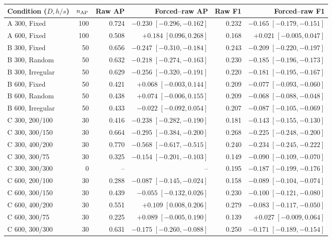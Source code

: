 \begin{tabular}{lrrrrr}
\toprule
Condition ($D,h/s$) & $n_{\rm AP}$ & Raw AP & Forced--raw AP & Raw F1 & Forced--raw F1 \\
\midrule
A 300, Fixed & 100 & 0.724 & $-0.230\;[-0.296,-0.162]$ & 0.232 & $-0.165\;[-0.179,-0.151]$ \\
A 600, Fixed & 100 & 0.508 & $+0.184\;[0.096,0.268]$ & 0.168 & $+0.021\;[-0.005,0.047]$ \\
B 300, Fixed & 50 & 0.656 & $-0.247\;[-0.310,-0.184]$ & 0.243 & $-0.209\;[-0.220,-0.197]$ \\
B 300, Random & 50 & 0.632 & $-0.218\;[-0.274,-0.163]$ & 0.230 & $-0.185\;[-0.196,-0.173]$ \\
B 300, Irregular & 50 & 0.629 & $-0.256\;[-0.320,-0.191]$ & 0.220 & $-0.181\;[-0.195,-0.167]$ \\
B 600, Fixed & 50 & 0.421 & $+0.068\;[-0.003,0.144]$ & 0.209 & $-0.077\;[-0.093,-0.060]$ \\
B 600, Random & 50 & 0.438 & $+0.074\;[-0.006,0.155]$ & 0.209 & $-0.068\;[-0.088,-0.048]$ \\
B 600, Irregular & 50 & 0.433 & $-0.022\;[-0.092,0.054]$ & 0.207 & $-0.087\;[-0.105,-0.069]$ \\
C 300, 200/100 & 30 & 0.416 & $-0.238\;[-0.282,-0.190]$ & 0.181 & $-0.143\;[-0.155,-0.130]$ \\
C 300, 300/150 & 30 & 0.664 & $-0.295\;[-0.384,-0.200]$ & 0.268 & $-0.225\;[-0.248,-0.200]$ \\
C 300, 400/200 & 30 & 0.770 & $-0.568\;[-0.617,-0.515]$ & 0.240 & $-0.234\;[-0.245,-0.222]$ \\
C 300, 300/75 & 30 & 0.325 & $-0.154\;[-0.201,-0.103]$ & 0.149 & $-0.090\;[-0.109,-0.070]$ \\
C 300, 300/300 & 0 & -- & -- & 0.195 & $-0.187\;[-0.199,-0.176]$ \\
C 600, 200/100 & 30 & 0.288 & $-0.087\;[-0.145,-0.024]$ & 0.158 & $-0.089\;[-0.104,-0.074]$ \\
C 600, 300/150 & 30 & 0.439 & $-0.055\;[-0.132,0.026]$ & 0.230 & $-0.100\;[-0.121,-0.080]$ \\
C 600, 400/200 & 30 & 0.551 & $+0.109\;[0.008,0.206]$ & 0.279 & $-0.083\;[-0.117,-0.050]$ \\
C 600, 300/75 & 30 & 0.225 & $+0.089\;[-0.005,0.190]$ & 0.139 & $+0.027\;[-0.009,0.064]$ \\
C 600, 300/300 & 30 & 0.631 & $-0.175\;[-0.260,-0.088]$ & 0.250 & $-0.171\;[-0.189,-0.154]$ \\
\bottomrule
\end{tabular}
